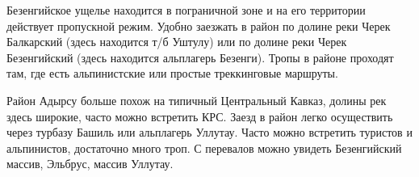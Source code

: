     Безенгийское ущелье находится в пограничной зоне и на его территории действует пропускной режим. Удобно заезжать в район по долине реки Черек Балкарский (здесь находится т/б Уштулу) или по долине реки
    Черек Безенгийский (здесь находится альплагерь Безенги). Тропы в районе проходят там, где есть альпинистские или простые
    треккинговые маршруты.

    Район Адырсу больше похож на типичный Центральный Кавказ, долины рек здесь широкие, часто можно встретить КРС. Заезд в
    район легко осуществить через турбазу Башиль или альплагерь Уллутау. Часто можно встретить туристов и альпинистов,
    достаточно много троп. С перевалов можно увидеть Безенгийский массив, Эльбрус, массив Уллутау.
